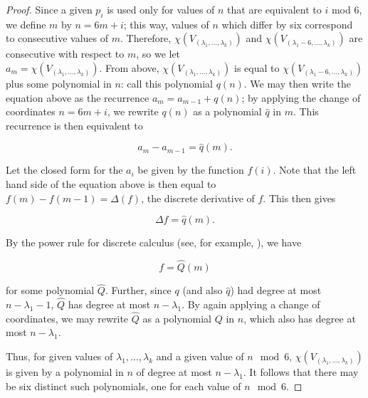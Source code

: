 \documentclass[12pt]{amsart}
\theoremstyle{definition}
\begin{document}
\begin{proof}
Since a given $p_i$ is used only for values of $n$ that are equivalent to $i$ mod 6, we define $m$ by $n=6m+i$; this way, values of $n$ which differ by six correspond to consecutive values of $m$. Therefore, $\chi(V_{(\lambda_1, ..., \lambda_k)})$ and $\chi(V_{(\lambda_1-6, ..., \lambda_k)})$ are consecutive with respect to $m$, so we let \\ $a_m = \chi(V_{(\lambda_1, ..., \lambda_k)})$. From above, $\chi(V_{(\lambda_1, ..., \lambda_k)})$ is equal to $\chi(V_{(\lambda_1-6, ..., \lambda_k)})$ plus some polynomial in $n$: call this polynomial $q(n)$. We may then write the equation above as the recurrence $a_m = a_{m-1} + q(n)$; by applying the change of coordinates $n=6m+i$, we rewrite $q(n)$ as a polynomial $\hat{q}$ in $m$. This recurrence is then equivalent to 

\[a_m - a_{m-1} = \hat{q}(m). \]

Let the closed form for the $a_i$ be given by the function $f(i)$. Note that the left hand side of the equation above is then equal to \\ $f(m) - f(m-1) = \Delta(f)$, the discrete derivative of $f$. This then gives

\[ \Delta f = \hat{q}(m).\]

By the power rule for discrete calculus (see, for example, \cite{CHR}), we have

\[ f = \hat{Q}(m) \]

for some polynomial $\hat{Q}$. Further, since $q$ (and also $\hat{q}$) had degree at most $n-\lambda_1 -1$, $\hat{Q}$ has degree at most $n  - \lambda_1$. By again applying a change of coordinates, we may rewrite $\hat{Q}$ as a polynomial $Q$ in $n$, which also has degree at most $n - \lambda_1$.

Thus, for given values of $\lambda_1, ..., \lambda_k$ and a given value of $n \mod 6$, $\chi(V_{(\lambda_1, ..., \lambda_k)})$ is given by a polynomial in $n$ of degree at most $n- \lambda_1$. It follows that there may be six distinct such polynomials, one for each value of $n \mod 6$.

\end{proof}



\end{document}

